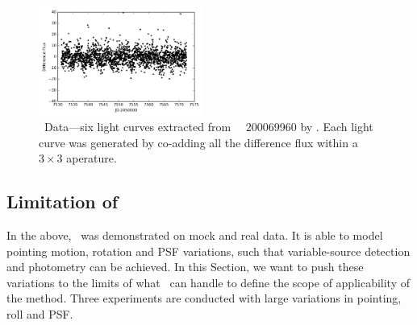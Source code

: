 \begin{figure}[p]
\begin{center}
\includegraphics[width=0.48\textwidth]{figures/cdi/f6f}
\end{center}
\caption[Light curves from \cpmdiff\ with \KTCN\ data]{
  \label{lightcurve}
  \KTCN\ Data---six light curves extracted from \KTCN\ \epic\ 200069960 by \cpmdiff. 
  Each light curve was generated by co-adding all the difference flux within a $3\times 3$ aperature.
}
\end{figure}


\subsection{Limitation of \cpmdiff}\label{limits}
In the above,  \cpmdiff\ was demonstrated on mock and real data. 
It is able to model pointing motion, rotation and PSF variations, such that variable-source detection and photometry can be achieved.
In this Section, we want to push these variations to the limits of what \cpmdiff\ can handle to define the scope of applicability of the method. 
Three experiments are conducted with large variations in pointing, roll and PSF.

